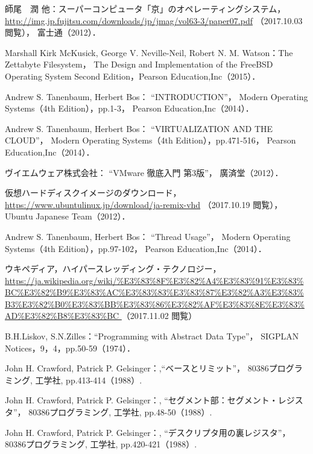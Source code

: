 \begin{thebibliography}{9}
師尾　潤 他：スーパーコンピュータ「京」のオペレーティングシステム，
\url{http://img.jp.fujitsu.com/downloads/jp/jmag/vol63-3/paper07.pdf}
（2017.10.03 閲覧），
富士通（2012）．

Marshall Kirk McKusick,
George V. Neville-Neil,
Robert N. M. Watson：The Zettabyte Filesystem，
The Design and Implementation of the FreeBSD Operating System
Second Edition，Pearson Education,Inc（2015）．


Andrew S. Tanenbaum, Herbert Bos：
``INTRODUCTION''，
Modern Operating Systems（4th Edition），pp.1-3，
Pearson Education,Inc（2014）．

Andrew S. Tanenbaum, Herbert Bos：
``VIRTUALIZATION AND THE CLOUD''，
Modern Operating Systems（4th Edition），pp.471-516，
Pearson Education,Inc（2014）．

ヴイエムウェア株式会社：
``VMware 徹底入門 第3版''，
廣済堂（2012）．

仮想ハードディスクイメージのダウンロード，
\url{https://www.ubuntulinux.jp/download/ja-remix-vhd}
（2017.10.19 閲覧），
Ubuntu Japanese Team（2012）．

Andrew S. Tanenbaum, Herbert Bos：
``Thread Usage''，
Modern Operating Systems（4th Edition），pp.97-102，
Pearson Education,Inc（2014）．

ウキペディア，ハイパースレッディング・テクノロジー，
\url{
https://ja.wikipedia.org/wiki/%
}（2017.11.02 閲覧）

B.H.Liskov, S.N.Zilles：``Programming with Abstract Data Type''，
SIGPLAN Notices，9，4，pp.50-59（1974）．

John H. Crawford, Patrick P. Gelsinger：,``ベースとリミット''，
80386プログラミング, 工学社, pp.413-414（1988）.

John H. Crawford, Patrick P. Gelsinger：,
``セグメント部：セグメント・レジスタ''，
80386プログラミング, 工学社, pp.48-50（1988）.

John H. Crawford, Patrick P. Gelsinger：,
``デスクリプタ用の裏レジスタ''，
80386プログラミング, 工学社, pp.420-421（1988）.

\end{thebibliography}

